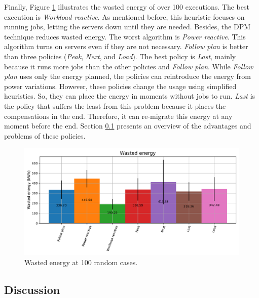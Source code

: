 Finally, Figure \ref{fig:energy_diff} illustrates the wasted energy of over 100 executions. The best execution is \emph{Workload reactive}. As mentioned before, this heuristic focuses on running jobs, letting the servers down until they are needed. Besides, the DPM technique reduces wasted energy. The worst algorithm is \emph{Power reactive}. This algorithm turns on servers even if they are not necessary. \emph{Follow plan} is better than three policies (\emph{Peak}, \emph{Next}, and \emph{Load}). The best policy is \emph{Last}, mainly because it runs more jobs than the other policies and \emph{Follow plan}. While \emph{Follow plan} uses only the energy planned, the policies can reintroduce the energy from power variations. However, these policies change the usage using simplified heuristics. So, they can place the energy in moments without jobs to run. \emph{Last} is the policy that suffers the least from this problem because it places the compensations in the end. Therefore, it can re-migrate this energy at any moment before the end. Section \ref{sec:compensation_discussion} presents an overview of the advantages and problems of these policies. 

\begin{figure}[!htb]
    \centering
    \includegraphics[scale=0.55]{Images/Compensations/energy_diff.pdf}
    \caption{Wasted energy at 100 random cases.}
    \label{fig:energy_diff}
\end{figure}

\clearpage

\subsection{Discussion}
\label{sec:compensation_discussion}

